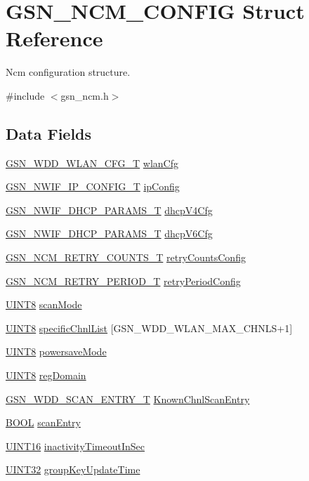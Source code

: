 \hypertarget{a00157}{
\section{GSN\_\-NCM\_\-CONFIG Struct Reference}
\label{a00157}
}


Ncm configuration structure.  




{\ttfamily \#include $<$gsn\_\-ncm.h$>$}

\subsection*{Data Fields}
\begin{DoxyCompactItemize}
\item 
\hyperlink{a00302}{GSN\_\-WDD\_\-WLAN\_\-CFG\_\-T} \hyperlink{a00157_af502582a323e9463e53f37b1fbd785bc}{wlanCfg}
\item 
\hyperlink{a00172}{GSN\_\-NWIF\_\-IP\_\-CONFIG\_\-T} \hyperlink{a00157_a1dede6b9b16f28827ae79e82aba27440}{ipConfig}
\item 
\hyperlink{a00168}{GSN\_\-NWIF\_\-DHCP\_\-PARAMS\_\-T} \hyperlink{a00157_ab0f8d1af7d88f225c55294a8f821fd67}{dhcpV4Cfg}
\item 
\hyperlink{a00168}{GSN\_\-NWIF\_\-DHCP\_\-PARAMS\_\-T} \hyperlink{a00157_a2d37f74ea39d1eb3096a12da8975ee58}{dhcpV6Cfg}
\item 
\hyperlink{a00161}{GSN\_\-NCM\_\-RETRY\_\-COUNTS\_\-T} \hyperlink{a00157_a7ddd9f43be1859c0966e7190ed9587a1}{retryCountsConfig}
\item 
\hyperlink{a00162}{GSN\_\-NCM\_\-RETRY\_\-PERIOD\_\-T} \hyperlink{a00157_ade18e0608856c6310d7545a5bdcaff73}{retryPeriodConfig}
\item 
\hyperlink{a00660_gab27e9918b538ce9d8ca692479b375b6a}{UINT8} \hyperlink{a00157_aae6d393064c283ee078d3402e32c1237}{scanMode}
\item 
\hyperlink{a00660_gab27e9918b538ce9d8ca692479b375b6a}{UINT8} \hyperlink{a00157_adcb5177c2842c84bf4ce839354d663d3}{specificChnlList} \mbox{[}GSN\_\-WDD\_\-WLAN\_\-MAX\_\-CHNLS+1\mbox{]}
\item 
\hyperlink{a00660_gab27e9918b538ce9d8ca692479b375b6a}{UINT8} \hyperlink{a00157_a6044064a1512395f0f8f1d181c541601}{powersaveMode}
\item 
\hyperlink{a00660_gab27e9918b538ce9d8ca692479b375b6a}{UINT8} \hyperlink{a00157_aa383b54497e68623f36213827ac7e5c8}{regDomain}
\item 
\hyperlink{a00400}{GSN\_\-WDD\_\-SCAN\_\-ENTRY\_\-T} \hyperlink{a00157_ab2c5c65b950489ba05abaaaf0036f231}{KnownChnlScanEntry}
\item 
\hyperlink{a00660_ga1f04022c0a182c51c059438790ea138c}{BOOL} \hyperlink{a00157_a91f968e9f2c8a0efa427266de24e8c54}{scanEntry}
\item 
\hyperlink{a00660_ga09f1a1fb2293e33483cc8d44aefb1eb1}{UINT16} \hyperlink{a00157_a6f21209eb61935400e9b58ac8c43913c}{inactivityTimeoutInSec}
\item 
\hyperlink{a00660_gae1e6edbbc26d6fbc71a90190d0266018}{UINT32} \hyperlink{a00157_adc9045c1c06adcde56a323e42f827f57}{groupKeyUpdateTime}
\end{DoxyCompactItemize}


